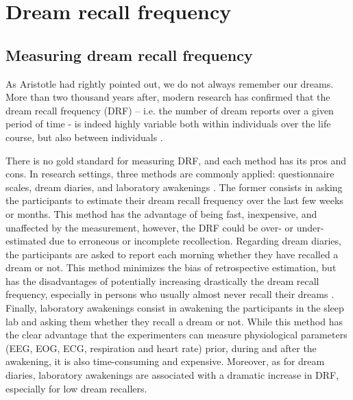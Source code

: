 \cleardoublepage

\chapter{Dream recall frequency}
\label{sec:dream-recall}


\section{Measuring dream recall frequency}
\label{sec:dream-recall:method}

As Aristotle had rightly pointed out, we do not always remember our dreams. More than two thousand years after, modern research has confirmed that the dream recall frequency (DRF) – i.e. the number of dream reports over a given period of time - is indeed highly variable both within individuals over the life course, but also between individuals \citep{schredl_factors_2003, ruby_experimental_2011}.

There is no gold standard for measuring DRF, and each method has its pros and cons. In research settings, three methods are commonly applied: questionnaire scales, dream diaries, and laboratory awakenings \citep{schredl_dream_1999}. The former consists in asking the participants to estimate their dream recall frequency over the last few weeks or months. This method has the advantage of being fast, inexpensive, and unaffected by the measurement, however, the DRF could be over- or under-estimated due to erroneous or incomplete recollection. Regarding dream diaries, the participants are asked to report each morning whether they have recalled a dream or not. This method minimizes the bias of retrospective estimation, but has the disadvantages of potentially increasing drastically the dream recall frequency, especially in persons who usually almost never recall their dreams \citep{schredl_questionnaires_2002}. Finally, laboratory awakenings consist in awakening the participants in the sleep lab and asking them whether they recall a dream or not. While this method has the clear advantage that the experimenters can measure physiological parameters (EEG, EOG, ECG, respiration and heart rate) prior, during and after the awakening, it is also time-consuming and expensive. Moreover, as for dream diaries, laboratory awakenings are associated with a dramatic increase in DRF, especially for low dream recallers.

